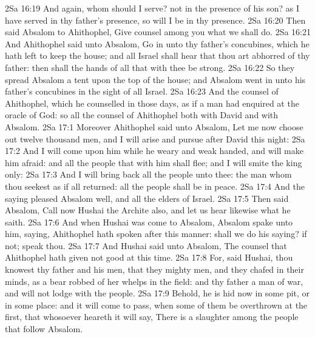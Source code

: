 \vs 2Sa 16:19 And again, whom should I serve?  not  in the presence of his son? as I have served in thy father's presence, so will I be in thy presence.
\vs 2Sa 16:20 Then said Absalom to Ahithophel, Give counsel among you what we shall do.
\vs 2Sa 16:21 And Ahithophel said unto Absalom, Go in unto thy father's concubines, which he hath left to keep the house; and all Israel shall hear that thou art abhorred of thy father: then shall the hands of all that  with thee be strong.
\vs 2Sa 16:22 So they spread Absalom a tent upon the top of the house; and Absalom went in unto his father's concubines in the sight of all Israel.
\vs 2Sa 16:23 And the counsel of Ahithophel, which he counselled in those days,  as if a man had enquired at the oracle of God: so  all the counsel of Ahithophel both with David and with Absalom.
\vs 2Sa 17:1 Moreover Ahithophel said unto Absalom, Let me now choose out twelve thousand men, and I will arise and pursue after David this night:
\vs 2Sa 17:2 And I will come upon him while he  weary and weak handed, and will make him afraid: and all the people that  with him shall flee; and I will smite the king only:
\vs 2Sa 17:3 And I will bring back all the people unto thee: the man whom thou seekest  as if all returned:  all the people shall be in peace.
\vs 2Sa 17:4 And the saying pleased Absalom well, and all the elders of Israel.
\vs 2Sa 17:5 Then said Absalom, Call now Hushai the Archite also, and let us hear likewise what he saith.
\vs 2Sa 17:6 And when Hushai was come to Absalom, Absalom spake unto him, saying, Ahithophel hath spoken after this manner: shall we do  his saying? if not; speak thou.
\vs 2Sa 17:7 And Hushai said unto Absalom, The counsel that Ahithophel hath given  not good at this time.
\vs 2Sa 17:8 For, said Hushai, thou knowest thy father and his men, that they  mighty men, and they  chafed in their minds, as a bear robbed of her whelps in the field: and thy father  a man of war, and will not lodge with the people.
\vs 2Sa 17:9 Behold, he is hid now in some pit, or in some  place: and it will come to pass, when some of them be overthrown at the first, that whosoever heareth it will say, There is a slaughter among the people that follow Absalom.
